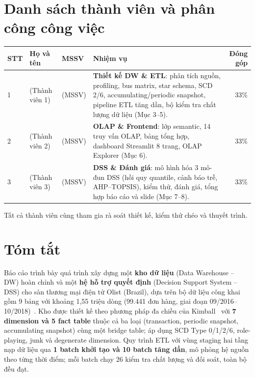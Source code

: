 \documentclass[a4paper]{article}
\newcommand{\thead}[1]{\textbf{#1}}
\begin{document}
\section*{Danh sách thành viên và phân công công việc}

\begin{table}[!htbp]
\centering
\small
\begin{tabularx}{\textwidth}{@{}l l l Y r@{}}
\toprule
\thead{STT} & \thead{Họ và tên} & \thead{MSSV} & \thead{Nhiệm vụ} & \thead{Đóng góp} \\
 & (Thành viên 1) & (MSSV) & \textbf{Thiết kế DW \& ETL}: phân tích nguồn, profiling, bus matrix, star schema, SCD 2/6, accumulating/periodic snapshot, pipeline ETL tăng dần, bộ kiểm tra chất lượng dữ liệu (Mục 3--5). & 33\% \\
2 & (Thành viên 2) & (MSSV) & \textbf{OLAP \& Frontend}: lớp semantic, 14 truy vấn OLAP, bảng tổng hợp, dashboard Streamlit 8 trang, OLAP Explorer (Mục 6). & 33\% \\
3 & (Thành viên 3) & (MSSV) & \textbf{DSS \& Đánh giá}: mô hình hóa 3 mô-đun DSS (hồi quy quantile, cảnh báo trễ, AHP--TOPSIS), kiểm thử, đánh giá, tổng hợp báo cáo và slide (Mục 7--8). & 33\% \\
\bottomrule
\end{tabularx}
\end{table}
\noindent Tất cả thành viên cùng tham gia rà soát thiết kế, kiểm thử chéo và thuyết trình.

\section*{Tóm tắt}
Báo cáo trình bày quá trình xây dựng một \textbf{kho dữ liệu} (Data Warehouse -- DW) hoàn chỉnh và một \textbf{hệ hỗ trợ quyết định} (Decision Support System -- DSS) cho sàn thương mại điện tử Olist (Brazil), dựa trên bộ dữ liệu công khai gồm 9 bảng với khoảng 1,55 triệu dòng (99.441 đơn hàng, giai đoạn 09/2016--10/2018)~\cite{olist2018}. Kho được thiết kế theo phương pháp đa chiều của Kimball~\cite{kimball2013} với \textbf{7 dimension và 5 fact table} thuộc cả ba loại (transaction, periodic snapshot, accumulating snapshot) cùng một bridge table; áp dụng SCD Type 0/1/2/6, role-playing, junk và degenerate dimension. Quy trình ETL với vùng staging hai tầng nạp dữ liệu qua \textbf{1 batch khởi tạo và 10 batch tăng dần}, mô phỏng hệ nguồn theo từng thời điểm; mỗi batch chạy 26 kiểm tra chất lượng và đối soát, toàn bộ đều đạt.
\end{document}
